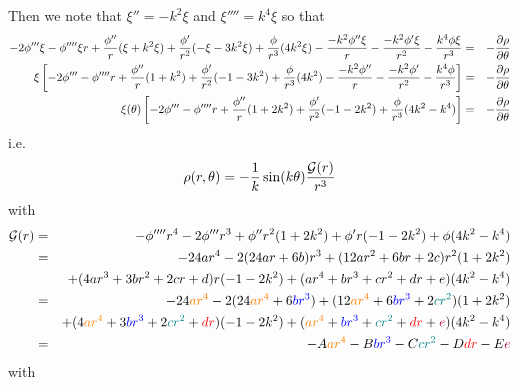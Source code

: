 Then we note that $\xi''=-k^2 \xi$ and $\xi''''=k^4 \xi$ so that
\begin{eqnarray}
 -2\phi''' \xi - \phi'''' \xi r
+ \frac{\phi''}{r  }  (\xi +k^2\xi)
+ \frac{\phi'}{r^2}  ( - \xi -3k^2\xi  )
+ \frac{\phi}{r^3} (4k^2  \xi  )
-\frac{- k^2\phi'' \xi}{r} - \frac{- k^2 \phi' \xi}{r^2} 
- \frac{k ^4 \phi\xi }{r^3}
&=&
- \frac{\partial \rho }{\partial \theta} \nonumber\\
\xi \left[ 
-2\phi'''  - \phi''''  r
+ \frac{\phi''}{r  }  (1+k^2)
+ \frac{\phi'}{r^2}  ( - 1 -3k^2  )
+ \frac{\phi}{r^3} (4k^2    )
-\frac{- k^2\phi'' }{r} - \frac{- k^2 \phi' }{r^2} 
- \frac{k ^4 \phi }{r^3}
\right]
&=& 
- \frac{\partial \rho }{\partial \theta} 
\nonumber\\
\xi(\theta) \left[ 
-2\phi'''  - \phi''''  r
+ \frac{\phi''}{r  }  (1+2k^2)
+ \frac{\phi'}{r^2}  ( - 1 -2k^2  )
+ \frac{\phi}{r^3} (4k^2 -k^4)
\right]
&=& 
- \frac{\partial \rho }{\partial \theta} \nonumber 
\end{eqnarray}
i.e.
\[
\rho(r,\theta) = -\frac{1}{k}\sin (k\theta) \frac{{\cal G}(r)}{r^3}
\]
with 
\begin{eqnarray}
{\cal G}(r)  
&=&  
- \phi''''  r^4
-2\phi''' r^3 
+ \phi'' r^2  (1+2k^2)
+ \phi' r  ( - 1 -2k^2  )
+ \phi (4k^2 -k^4) \nonumber\\
&=& - 24a r^4
-2 (24 ar + 6b) r^3
+ ( 12 ar^2 + 6 br + 2c) r^2 (1+2k^2) \nonumber\\
&&+  (4ar^3+3br^2 +2cr + d) r ( - 1 -2k^2  )
+ (ar^4+br^3+cr^2+dr+e) (4k^2 -k^4) \nonumber\\
&=& - 24{\color{orange} ar^4}
-2 (24 {\color{orange} ar^4} + 6{\color{blue} br^3})
+ ( 12 {\color{orange} ar^4} + 6 {\color{blue} br^3} + 2{\color{teal}c r^2}) (1+2k^2) \nonumber\\
&&+  (4{\color{orange} ar^4}+3{\color{blue} br^3} +2{\color{teal}c r^2} + {\color{red}dr})  ( - 1 -2k^2  )
+ ({\color{orange} ar^4}+{\color{blue} br^3}+{\color{teal}c r^2}+{\color{red}dr}+{\color{purple}e}) (4k^2 -k^4) \nonumber\\
&=& -A{\color{orange} ar^4} - B{\color{blue} br^3} - 
C{\color{teal}c r^2} - D{\color{red}dr} -E{\color{purple}e} \nonumber
\end{eqnarray}
with 
